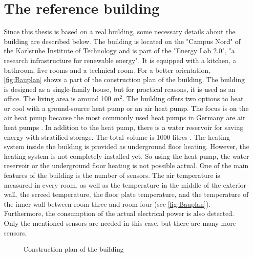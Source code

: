 \section{The reference building}
\label{section:building}
    Since this thesis is based on a real building, some necessary details about the building are described below.
    \newline
    The building is located on the "Campus Nord" of the Karlsruhe Institute of Technology and is part of the "Energy Lab 2.0", "a research infrastructure for renewable energy"\cite{KIT.2021}. It is equipped with a kitchen, a bathroom, five rooms and a technical room. For a better orientation, \autoref{fig:Bauplan} shows a part of the construction plan of the building. The building is designed as a single-family house, but for practical reasons, it is used as an office. The living area is around 100 $m^2$. The building offers two options to heat or cool with a ground-source heat pump or an air heat pump. The focus is on the air heat pump because the most commonly used heat pumps in Germany are air heat pumps \cite{bwp.2021}. In addition to the heat pump, there is a water reservoir for saving energy with stratified storage. The total volume is 1000 litres \cite{Oskar}. The heating system inside the building is provided as underground floor heating. However, the heating system is not completely installed yet. So using the heat pump, the water reservoir or the underground floor heating is not possible actual.
    \newline
    One of the main features of the building is the number of sensors. The air temperature is measured in every room, as well as the temperature in the middle of the exterior wall, the screed temperature, the floor plate temperature, and the temperature of the inner wall between room three and room four (see \autoref{fig:Bauplan}). Furthermore, the consumption of the actual electrical power is also detected. Only the mentioned sensors are needed in this case, but there are many more sensors.
    \begin{figure}
        \centering
        \def\svgwidth{320pt}
        
        \caption{Construction plan of the building \cite{Bauplan}}
        \label{fig:Bauplan}
    \end{figure}